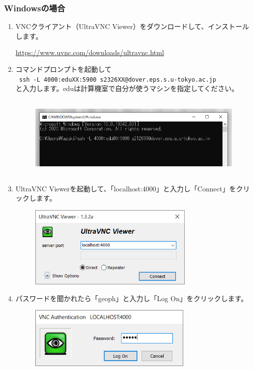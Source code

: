 \documentclass{jarticle}
\begin{document}
\subsubsection{Windowsの場合}
\begin{enumerate}
  \item VNCクライアント（UltraVNC Viewer）をダウンロードして、インストールします。
  \begin{center}
    \url{https://www.uvnc.com/downloads/ultravnc.html}
  \end{center}
  \item コマンドプロンプトを起動して\\
    \verb| ssh -L 4000:eduXX:5900 s2326XX@dover.eps.s.u-tokyo.ac.jp |  \\
  と入力します。eduは計算機室で自分が使うマシンを指定してください。
  \begin{figure}[H]
    \centering
    \includegraphics[height=4cm,pagebox=cropbox,clip]{fig/VNCWin1.png}
  \end{figure}
  \item UltraVNC Viewerを起動して、「localhost:4000」と入力し「Connect」をクリックします。
  \begin{figure}[H]
    \centering
    \includegraphics[height=4cm,pagebox=cropbox,clip]{fig/VNCWin2.png}
  \end{figure}
  \item パスワードを聞かれたら「geoph」と入力し「Log On」をクリックします。
  \begin{figure}[H]
    \centering
    \includegraphics[height=3cm,pagebox=cropbox,clip]{fig/VNCWin3.png}

\end{figure}
\end{enumerate}
\end{document}
